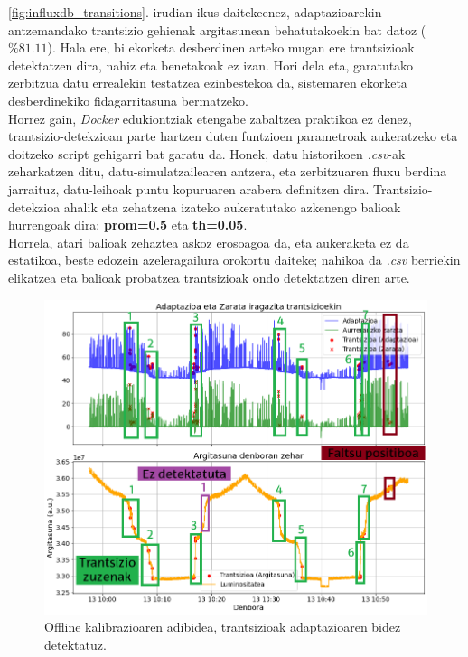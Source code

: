 \documentclass[12pt]{article}
\numberwithin{figure}{section}
\numberwithin{equation}{section}
\begin{document}
\ref{fig:influxdb_transitions}. irudian ikus daitekeenez, adaptazioarekin antzemandako trantsizio gehienak argitasunean behatutakoekin bat datoz ($\%81.11$). Hala ere, bi ekorketa desberdinen arteko mugan ere trantsizioak detektatzen dira, nahiz eta benetakoak ez izan. Hori dela eta, garatutako zerbitzua datu errealekin testatzea ezinbestekoa da, sistemaren ekorketa desberdinekiko fidagarritasuna bermatzeko.\\

Horrez gain, \textit{Docker} edukiontziak etengabe zabaltzea praktikoa ez denez, trantsizio\hyp{}detekzioan parte hartzen duten funtzioen parametroak aukeratzeko eta doitzeko script gehigarri bat garatu da. Honek, datu historikoen \textit{.csv}-ak zeharkatzen ditu, datu-simulatzailearen antzera, eta zerbitzuaren fluxu berdina jarraituz, datu-leihoak puntu kopuruaren arabera definitzen dira. Trantsizio-detekzioa ahalik eta zehatzena izateko aukeratutako azkenengo balioak hurrengoak dira: \textbf{prom=0.5} eta \textbf{th=0.05}.\\

Horrela, atari balioak zehaztea askoz erosoagoa da, eta aukeraketa ez da estatikoa, beste edozein azeleragailura orokortu daiteke; nahikoa da \textit{.csv} berriekin elikatzea eta balioak probatzea trantsizioak ondo detektatzen diren arte.

\begin{figure}[h]
    \centering
    \includegraphics[width=0.85\linewidth]{5 - Zerbitzuaren garapena/offline_kalibrazioa.png}
    \caption{Offline kalibrazioaren adibidea, trantsizioak adaptazioaren bidez detektatuz.}
    \label{fig:offline_kalibrazioa}
\end{figure}
\end{document}

